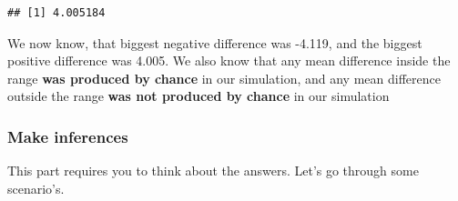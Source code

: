\documentclass[]{book}
\begin{document}
\begin{verbatim}
## [1] 4.005184
\end{verbatim}

We now know, that biggest negative difference was -4.119, and the
biggest positive difference was 4.005. We also know that any mean
difference inside the range \textbf{was produced by chance} in our
simulation, and any mean difference outside the range \textbf{was not
produced by chance} in our simulation

\subsubsection{Make inferences}\label{make-inferences}

This part requires you to think about the answers. Let's go through some
scenario's.
\end{document}
